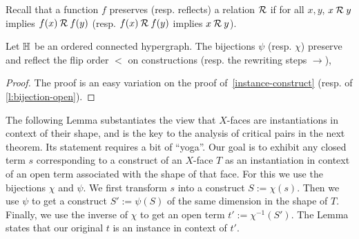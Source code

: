 
Recall that a function $f$ preserves (resp. reflects) a relation  ${\cal R}$ if for all $x,y$, $x\:{\cal R}\:y$ implies $f(x)\:{\cal R}\: f(y)$ (resp.  $f(x)\:{\cal R} \:f(y)$ implies
$x\:{\cal R}\:y$).

\begin{lemma} \label{face-flip}
  Let ${\mathbb H}$ be an ordered connected hypergraph.  The bijections $\psi$ (resp. $\chi$)
 preserve and reflect the flip order $<$ on constructions (resp. the rewriting steps $\to$),
 
 

\end{lemma}
\begin{proof} The proof is an easy variation on the proof of~\cref{instance-construct} (resp. of  \cref{l:bijection-open}).

\end{proof}
The following Lemma substantiates the view that $X$-faces are instantiations in context of their shape, and is the key to the analysis of critical pairs in the next theorem. 
Its statement requires a bit of ``yoga''. Our goal is to exhibit any closed term $s$ corresponding to a construct of an $X$-face $T$ as an instantiation in context  of an open term associated with the shape of that face.
For this we use the bijections $\chi$ and $\psi$. We first transform $s$ into a construct $S:=\chi(s)$. 
Then we use $\psi$ to get a construct $S':=\psi(S)$ of the same dimension in the shape of $T$. 
Finally, we use the inverse of $\chi$ to get an open term
$t':=\chi^{-1}(S')$. 
The Lemma states that our original $t$ is an instance in context of $t'$.

